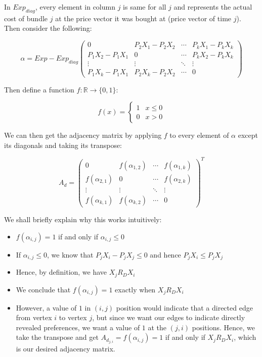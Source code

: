 \documentclass{article} %
\begin{document}
In $Exp_{diag}$, every element in column $j$ is same for all $j$ and represents the actual cost of bundle $j$ at the price vector it was bought at (price vector of time $j$). Then consider the following:

\[
\alpha = Exp-Exp_{diag}
 \begin{pmatrix}
  0 & P_2X_1-P_2X_2 & \cdots & P_kX_1-P_kX_k \\
  P_1X_2-P_1X_1 & 0 & \cdots & P_kX_2-P_kX_k \\
  \vdots  & \vdots  & \ddots & \vdots  \\
  P_1X_k-P_1X_1 & P_2X_k-P_2X_2 & \cdots & 0
 \end{pmatrix}
\]

Then define a function $f:\mathbb{R}\to\{0,1\}$:

\[ 
f(x)=
    \begin{cases} 
      1 & x\leq0 \\
      0 & x>0
   \end{cases}
\]

We can then get the adjacency matrix by applying $f$ to every element of $\alpha$ except its diagonals and taking its transpose:

\[
A_d =
 \begin{pmatrix}
  0 & f(\alpha_{1,2}) & \cdots & f(\alpha_{1,k}) \\
  f(\alpha_{2,1}) & 0 & \cdots & f(\alpha_{2,k}) \\
  \vdots  & \vdots  & \ddots & \vdots  \\
  f(\alpha_{k,1}) & f(\alpha_{k,2}) & \cdots & 0
 \end{pmatrix} ^T
\]

We shall briefly explain why this works intuitively:

\begin{itemize}
    \item $f(\alpha_{i,j})=1$ if and only if $\alpha_{i,j}\leq0$
    \item If $\alpha_{i,j}\leq0$, we know that $P_jX_i-P_jX_j\leq0$ and hence $P_jX_i\leq P_jX_j$
    \item Hence, by definition, we have $X_j R_D X_i$
    \item We conclude that $f(\alpha_{i,j})=1$ exactly when $X_j R_D X_i$
    \item However, a value of $1$ in $(i,j)$ position would indicate that a directed edge from vertex $i$ to vertex $j$, but since we want our edges to indicate directly revealed preferences, we want a value of $1$ at the $(j,i)$ positions. Hence, we take the transpose and get $A_{d_{j,i}}=f(\alpha_{i,j})=1$ if and only if $X_j R_D X_i$, which is our desired adjacency matrix.
\end{itemize}
\end{document}
